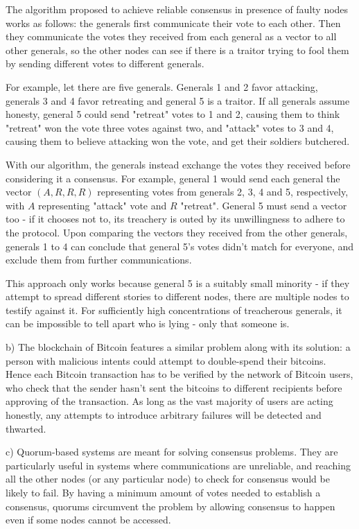 \documentclass[12pt,a4paper,titlepage]{article}
\begin{document}
The algorithm proposed to achieve reliable consensus in presence of faulty nodes works as follows: the generals first communicate their vote to each other. Then they communicate the votes they received from each general as a vector to all other generals, so the other nodes can see if there is a traitor trying to fool them by sending different votes to different generals.

For example, let there are five generals. Generals 1 and 2 favor attacking, generals 3 and 4 favor retreating and general 5 is a traitor. If all generals assume honesty, general 5 could send "retreat" votes to 1 and 2, causing them to think "retreat" won the vote three votes against two, and "attack" votes to 3 and 4, causing them to believe attacking won the vote, and get their soldiers butchered.

With our algorithm, the generals instead exchange the votes they received before considering it a consensus. For example, general 1 would send each general the vector $(A, R, R, R)$ representing votes from generals 2, 3, 4 and 5, respectively, with $A$ representing "attack" vote and $R$ "retreat". General 5 must send a vector too - if it chooses not to, its treachery is outed by its unwillingness to adhere to the protocol. Upon comparing the vectors they received from the other generals, generals 1 to 4 can conclude that general 5's votes didn't match for everyone, and exclude them from further communications.

This approach only works because general 5 is a suitably small minority - if they attempt to spread different stories to different nodes, there are multiple nodes to testify against it. For sufficiently high concentrations of treacherous generals, it can be impossible to tell apart who is lying - only that someone is.


b) The blockchain of Bitcoin features a similar problem along with its solution: a person with malicious intents could attempt to double-spend their bitcoins. Hence each Bitcoin transaction has to be verified by the network of Bitcoin users, who check that the sender hasn't sent the bitcoins to different recipients before approving of the transaction. As long as the vast majority of users are acting honestly, any attempts to introduce arbitrary failures will be detected and thwarted.


c) Quorum-based systems are meant for solving consensus problems. They are particularly useful in systems where communications are unreliable, and reaching all the other nodes (or any particular node) to check for consensus would be likely to fail. By having a minimum amount of votes needed to establish a consensus, quorums circumvent the problem by allowing consensus to happen even if some nodes cannot be accessed.
\end{document}
